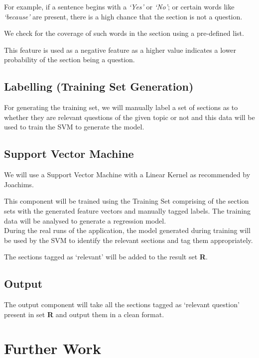 \documentclass[10pt,a4paper]{report}
\begin{document}
For example, if a sentence begins with a \textit{`Yes'} or \textit{`No'}; or certain words like \textit{`because'} are present, there is a high chance that the section is not a question. 

We check for the coverage of such words in the section using a pre-defined list. 

This feature is used as a negative feature as a higher value indicates a lower probability of the section being a question.

\section{Labelling (Training Set Generation)}

For generating the training set, we will manually label a set of sections as to whether they are relevant questions of the given topic or not and this data will be used to train the SVM to generate the model. 

\section{Support Vector Machine}

We will use a Support Vector Machine with a Linear Kernel as recommended by Joachims\cite{joachims}.

This component will be trained using the Training Set comprising of the section sets with the generated feature vectors and manually tagged labels. The training data will be analysed to generate a regression model. \\

During the real runs of the application, the model generated during training will be used by the SVM to identify the relevant sections and tag them appropriately. 

The sections tagged as `relevant' will be added to the result set \textbf{R}.\\

\section{Output}

The output component will take all the sections tagged as `relevant question' present in set \textbf{R} and output them in a clean format.


\chapter{Further Work}
\end{document}
